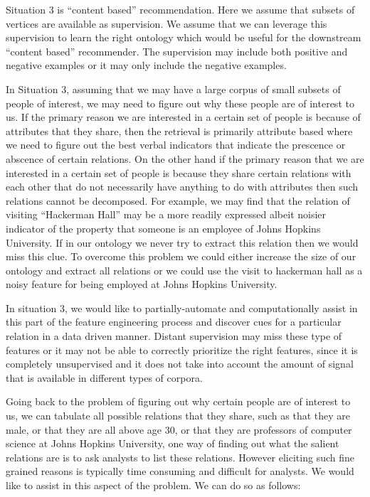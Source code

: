 \documentclass[paper=a4,fontsize=11pt]{scrartcl}
\numberwithin{equation}{section}    %
\numberwithin{figure}{section}      %
\numberwithin{table}{section}       %
\begin{document}
Situation 3 is ``content based'' recommendation. Here we assume that subsets of 
 vertices are available as supervision. We assume that we can leverage this
 supervision to learn the right ontology which would be useful for the downstream
 ``content based'' recommender. The supervision may include both positive and 
 negative examples or it may only include the negative examples.

In Situation 3, assuming that we may have a large corpus of small subsets of 
people of interest, we may need to figure out why these people are
of interest to us. If the primary reason we are interested in a certain set 
of people is because of attributes that they share, then the retrieval is 
primarily attribute based where we need to figure out the best verbal indicators
that indicate the prescence or abscence of certain relations. On the other hand 
if the primary reason that we are interested in a certain set of people is because 
they share certain relations with each other that do not necessarily 
have anything to do with attributes then such relations cannot be decomposed.
For example, we may find that the relation of visiting ``Hackerman Hall'' may 
be a more readily expressed albeit noisier indicator of the property that someone is
an employee of Johns Hopkins University. If in our ontology we never try to 
extract this relation then we would miss this clue. To overcome this problem
we could either increase the size of our ontology and extract all relations 
or we could use the visit to hackerman hall as a noisy feature for being employed 
at Johns Hopkins University. 

In situation 3, we would like to partially-automate and computationally assist in
 this part of the feature 
engineering process and discover cues for a particular relation 
in a data driven manner. Distant supervision may miss these type of features or 
it may not be able to correctly prioritize the right features, since it is completely
unsupervised and it does not take into account the amount of signal that is available
in different types of corpora.

Going back to the problem of figuring out why certain people are of interest to us, 
we can tabulate all possible relations that they share, such as that they are male, 
or that they are all above age 30, or that they are professors of computer science
at Johns Hopkins University, one way of finding out what the salient relations are is
to ask analysts to list these relations. However eliciting such fine grained reasons is 
typically time consuming and difficult for analysts. We would like to assist in this
aspect of the problem. We can do so as follows:
\end{document}
